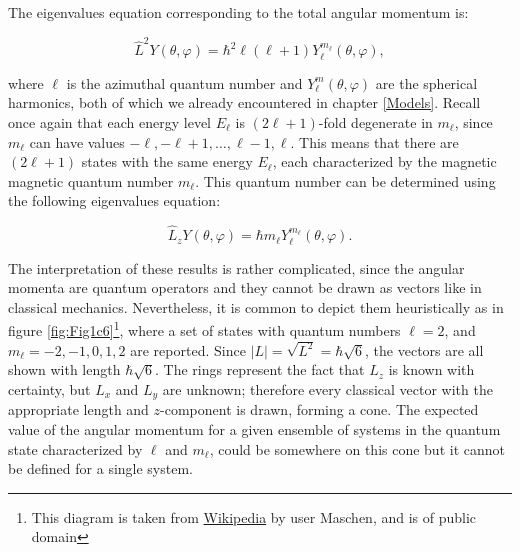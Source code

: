 \documentclass[
  9pt,
]{extbook}
\theoremstyle{definition}
\theoremstyle{definition}
\theoremstyle{definition}
\theoremstyle{remark}
\begin{document}
The eigenvalues equation corresponding to the total angular momentum is:

\begin{equation}
\hat{L}^2 Y(\theta, \varphi) =
\hbar^2 \ell(\ell+1) Y_{\ell}^{m_{\ell}}(\theta, \varphi),
\label{eq:angmom3}
\end{equation}

where \(\ell\) is the azimuthal quantum number and \(Y_{\ell}^m(\theta, \varphi)\) are the spherical harmonics, both of which we already encountered in chapter \ref{Models}. Recall once again that each energy level \(E_{\ell}\) is \((2\ell+1)\)-fold degenerate in \(m_{\ell}\), since \(m_{\ell}\) can have values \(-\ell, -\ell+1, \ldots, \ell-1, \ell\). This means that there are \((2\ell+1)\) states with the same energy \(E_{\ell}\), each characterized by the magnetic magnetic quantum number \(m_{\ell}\). This quantum number can be determined using the following eigenvalues equation:

\begin{equation}
\hat{L}_z Y(\theta, \varphi) =
\hbar m_{\ell} Y_{\ell}^{m_{\ell}}(\theta, \varphi).
\label{eq:angmom4}
\end{equation}

The interpretation of these results is rather complicated, since the angular momenta are quantum operators and they cannot be drawn as vectors like in classical mechanics. Nevertheless, it is common to depict them heuristically as in figure \ref{fig:Fig1c6}\footnote{This diagram is taken from \href{https://en.wikipedia.org/wiki/Angular_momentum_operator\#/media/File:Vector_model_of_orbital_angular_momentum.svg}{Wikipedia} by user Maschen, and is of public domain}, where a set of states with quantum numbers \(\ell =2\), and \(m_{\ell}=-2,-1,0,1,2\) are reported. Since \(|L|={\sqrt {L^{2}}}=\hbar {\sqrt {6}}\), the vectors are all shown with length \(\hbar \sqrt{6}\). The rings represent the fact that \(L_{z}\) is known with certainty, but \(L_{x}\) and \(L_{y}\) are unknown; therefore every classical vector with the appropriate length and \(z\)-component is drawn, forming a cone. The expected value of the angular momentum for a given ensemble of systems in the quantum state characterized by \(\ell\) and \(m_{\ell}\), could be somewhere on this cone but it cannot be defined for a single system.
\end{document}
